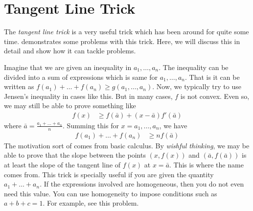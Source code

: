 \documentclass[inequalities.tex]{subfile}
\begin{document}
	
	\section{Tangent Line Trick}\label{sec:tangent}
	The \textit{tangent line trick} is a very useful trick which has been around for quite some time. \textcite{li_2006} demonstrates some problems with this trick. Here, we will discuss this in detail and show how it can tackle problems.
	
	Imagine that we are given an inequality in $a_{1},\ldots,a_{n}$. The inequality can be divided into a sum of expressions which is same for $a_{1},\ldots,a_{n}$. That is it can be written as $f(a_{1})+\ldots+f(a_{n})\geq g(a_{1},\ldots,a_{n})$. Now, we typically try to use Jensen's inequality in cases like this. But in many cases,  $f$ is not convex. Even so, we may still be able to prove something like
		\begin{align*}
			f(x)
				& \geq f(\bar{a})+(x-\bar{a})f'(\bar{a})
		\end{align*}
	where $\bar{a}=\frac{a_{1}+\ldots+a_{n}}{n}$. Summing this for $x=a_{1},\ldots,a_{n}$, we have
		\begin{align*}
			f(a_{1})+\ldots+f(a_{n})
				& \geq nf(\bar{a})
		\end{align*}
	The motivation sort of comes from basic calculus. By \textit{wishful thinking}, we may be able to prove that the slope between the points $(x,f(x))$ and $(\bar{a},f(\bar{a}))$ is at least the slope of the tangent line of $f(x)$ at $x=\bar{a}$. This is where the name comes from. This trick is specially useful if you are given the quantity $a_{1}+\ldots+a_{n}$. If the expressions involved are homogeneous, then you do not even need this value. You can use homogeneity to impose conditions such as $a+b+c=1$. For example, see this problem.
\end{document}
